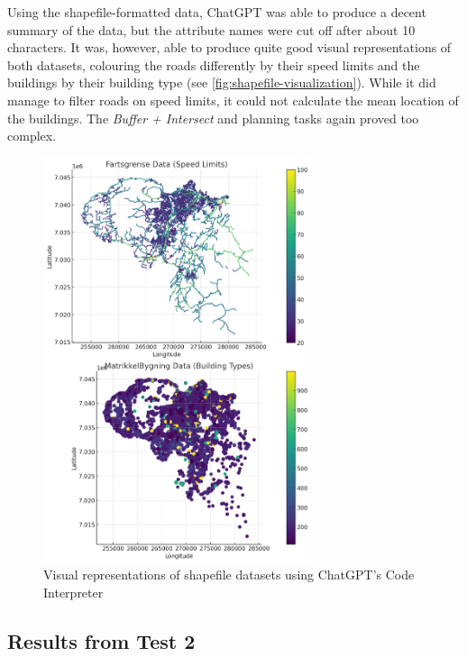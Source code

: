 Using the shapefile-formatted data, ChatGPT was able to produce a decent summary of the data, but the attribute names were cut off after about 10 characters. It was, however, able to produce quite good visual representations of both datasets, colouring the roads differently by their speed limits and the buildings by their building type (see \autoref{fig:shapefile-visualization}). While it did manage to filter roads on speed limits, it could not calculate the mean location of the buildings. The \textit{Buffer + Intersect} and planning tasks again proved too complex.

\begin{figure}
    \centering
    \includegraphics[width=0.7\textwidth]{../figs/shape_plot.png}
    \caption{Visual representations of shapefile datasets using ChatGPT's Code Interpreter}
    \label{fig:shapefile-visualization}
\end{figure}

\subsection{Results from Test 2}\label{subsec:experiment-2-results}

